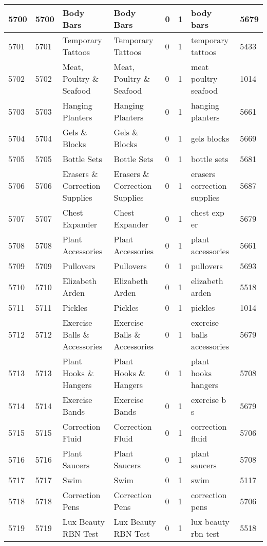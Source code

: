 \begin{longtable}{|l|l|l|l|l|l|l|l|}
5700 & 5700 & Body Bars & Body Bars & 0 & 1 & body bars & 5679 \\ \hline 
5701 & 5701 & Temporary Tattoos & Temporary Tattoos & 0 & 1 & temporary tattoos & 5433 \\ \hline 
5702 & 5702 & Meat, Poultry \& Seafood & Meat, Poultry \& Seafood & 0 & 1 & meat poultry seafood & 1014 \\ \hline 
5703 & 5703 & Hanging Planters & Hanging Planters & 0 & 1 & hanging planters & 5661 \\ \hline 
5704 & 5704 & Gels \& Blocks & Gels \& Blocks & 0 & 1 & gels blocks & 5669 \\ \hline 
5705 & 5705 & Bottle Sets & Bottle Sets & 0 & 1 & bottle sets & 5681 \\ \hline 
5706 & 5706 & Erasers \& Correction Supplies & Erasers \& Correction Supplies & 0 & 1 & erasers correction supplies & 5687 \\ \hline 
5707 & 5707 & Chest Expander & Chest Expander & 0 & 1 & chest exp er & 5679 \\ \hline 
5708 & 5708 & Plant Accessories & Plant Accessories & 0 & 1 & plant accessories & 5661 \\ \hline 
5709 & 5709 & Pullovers & Pullovers & 0 & 1 & pullovers & 5693 \\ \hline 
5710 & 5710 & Elizabeth Arden & Elizabeth Arden & 0 & 1 & elizabeth arden & 5518 \\ \hline 
5711 & 5711 & Pickles & Pickles & 0 & 1 & pickles & 1014 \\ \hline 
5712 & 5712 & Exercise Balls \& Accessories & Exercise Balls \& Accessories & 0 & 1 & exercise balls accessories & 5679 \\ \hline 
5713 & 5713 & Plant Hooks \& Hangers & Plant Hooks \& Hangers & 0 & 1 & plant hooks hangers & 5708 \\ \hline 
5714 & 5714 & Exercise Bands & Exercise Bands & 0 & 1 & exercise b s & 5679 \\ \hline 
5715 & 5715 & Correction Fluid & Correction Fluid & 0 & 1 & correction fluid & 5706 \\ \hline 
5716 & 5716 & Plant Saucers & Plant Saucers & 0 & 1 & plant saucers & 5708 \\ \hline 
5717 & 5717 & Swim & Swim & 0 & 1 & swim & 5117 \\ \hline 
5718 & 5718 & Correction Pens & Correction Pens & 0 & 1 & correction pens & 5706 \\ \hline 
5719 & 5719 & Lux Beauty RBN Test & Lux Beauty RBN Test & 0 & 1 & lux beauty rbn test & 5518 \\ \hline 

\end{longtable}
